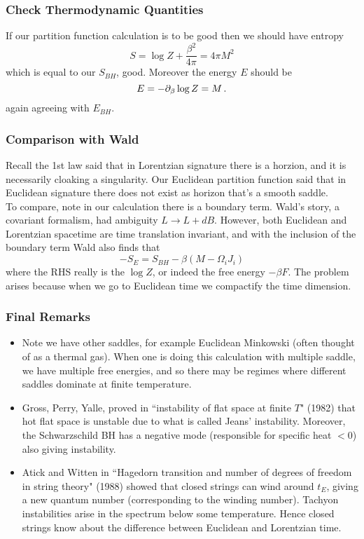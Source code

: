 \documentclass{article}
\begin{document}
\subsubsection{Check Thermodynamic Quantities} 
If our partition function calculation is to be good then we should have entropy 
\[
S = \log Z + \frac{\beta^2}{4 \pi} = 4 \pi M^2 
\]
which is equal to our $S_{BH}$, good. Moreover the energy $E$ should be 
\[
E = -\partial_\beta \log Z = M \, .
\]
again agreeing with $E_{BH}$. 

\subsubsection{Comparison with Wald} 
Recall the 1st law said that in Lorentzian signature there is a horzion, and it is necessarily cloaking a singularity. Our Euclidean partition function said that in Euclidean signature there does not exist as horizon that's a smooth saddle. \\
To compare, note in our calculation there is a boundary term. Wald's story, a covariant formalism, had ambiguity $L \to L+dB$. However, both Euclidean and Lorentzian spacetime are time translation invariant, and with the inclusion of the boundary term Wald also finds that 
\[
-S_E = S_{BH} - \beta (M - \Omega_i J_i)
\]
where the RHS really is the $\log Z$, or indeed the free energy $-\beta F$. The problem arises because when we go to Euclidean time we compactify the time dimension.

\subsubsection{Final Remarks} 
\begin{itemize}
	\item Note we have other saddles, for example Euclidean Minkowski (often thought of as a thermal gas). When one is doing this calculation with multiple saddle, we have multiple free energies, and so there may be regimes where different saddles dominate at finite temperature.
	\item Gross, Perry, Yalle, proved in ``instability of flat space at finite $T$" (1982) that hot flat space is unstable due to what is called Jeans' instability. Moreover, the Schwarzschild BH has a negative mode (responsible for specific heat $<0$) also giving instability.
	\item Atick and Witten in ``Hagedorn transition and number of degrees of freedom in string theory" (1988) showed that closed strings can wind around $t_E$, giving a new quantum number (corresponding to the winding number). Tachyon instabilities arise in the spectrum below some temperature. Hence closed strings know about the difference between Euclidean and Lorentzian time. 
\end{itemize}
\end{document}
